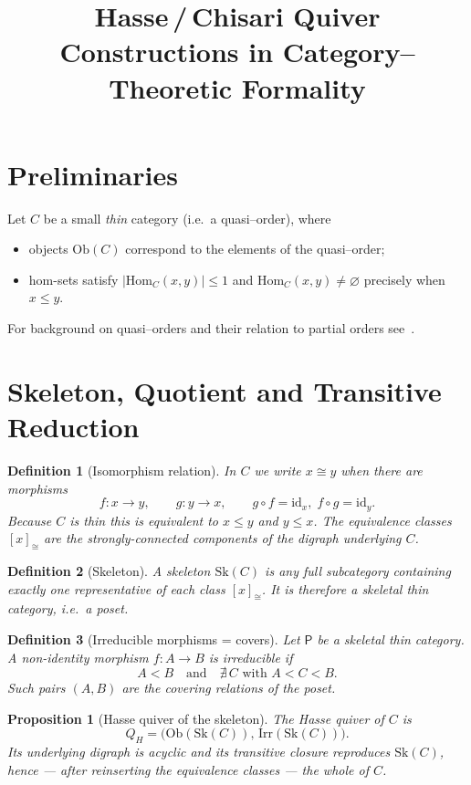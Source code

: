 \documentclass{article}
\title{Hasse\,/\,Chisari Quiver Constructions in Category--Theoretic Formality}
\author{}
\date{}
\newtheorem{definition}{Definition}
\newtheorem{proposition}{Proposition}
\begin{document}
\maketitle

\section{Preliminaries}
Let $C$ be a small \emph{thin} category (i.e.~a quasi--order), where
\begin{itemize}
  \item objects $\mathrm{Ob}(C)$ correspond to the elements of the quasi--order;  
  \item hom-sets satisfy $|\mathrm{Hom}_C(x,y)|\le 1$ and $\mathrm{Hom}_C(x,y)\neq\varnothing$ precisely when $x\le y$.
\end{itemize}
For background on quasi--orders and their relation to partial orders see~\cite{Rosenstein1982}.

\section{Skeleton, Quotient and Transitive Reduction}

\begin{definition}[Isomorphism relation]\label{def:iso}
In $C$ we write $x\cong y$ when there are morphisms
\[
  f: x\to y, \qquad g:y\to x, \qquad g\!\circ\!f = \mathrm{id}_x,\; f\!\circ\!g = \mathrm{id}_y.
\]
Because $C$ is thin this is equivalent to $x\le y$ and $y\le x$.  The equivalence classes $[x]_{\cong}$ are the \emph{strongly-connected components} of the digraph underlying $C$.
\end{definition}

\begin{definition}[Skeleton]
A \emph{skeleton} $\mathrm{Sk}(C)$ is any full subcategory containing exactly one representative of each class $[x]_{\cong}$.  It is therefore a \emph{skeletal} thin category, i.e.~a poset.
\end{definition}

\begin{definition}[Irreducible morphisms = covers]
Let $\mathsf{P}$ be a skeletal thin category.  A non-identity morphism $f\!:\!A\to B$ is \emph{irreducible} if
\[
  A < B \quad\text{and}\quad \nexists\,C\text{ with }A<C<B.
\]
Such pairs $(A,B)$ are the \emph{covering relations} of the poset.
\end{definition}

\begin{proposition}[Hasse quiver of the skeleton]
The Hasse quiver of $C$ is
\[
  Q_H = \bigl(\mathrm{Ob}(\mathrm{Sk}(C)),\,\mathrm{Irr}(\mathrm{Sk}(C))\bigr).
\]
Its underlying digraph is acyclic and its transitive closure reproduces $\mathrm{Sk}(C)$, hence --- after reinserting the equivalence classes --- the whole of $C$.
\end{proposition}
\end{document}
